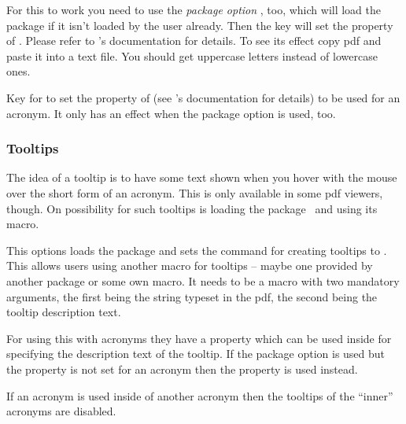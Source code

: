 \documentclass[load-preamble+]{cnltx-doc}
\begin{document}
For this to work you need to use the \emph{package option} ,
too, which will load the package  if it isn't loaded by the user
already.  Then the key  will set the 
property of .  Please refer to 's documentation
for details.  To see its effect copy \ac{pdf} and paste it into a text file.
You should get uppercase letters instead of lowercase ones.

\begin{options}
    Key for  to set the  property of
     (see 's documentation for details) to be
    used for an acronym.  It only has an effect when the package option
     is used, too.
\end{options}

\subsubsection{Tooltips}

The idea of a tooltip is to have some text shown when you hover with the
mouse over the short form of an acronym.  This is only available in some
\acs{pdf} viewers, though.  On possibility for such tooltips is loading the
 package~\cite{pkg:pdfcomment} and using its 
macro.

\begin{options}
    This options loads the  package and sets
    the command for creating tooltips to .
    This allows users using another macro for tooltips --
    maybe one provided by another package or some own macro.  It needs to be a
    macro with two mandatory arguments, the first being the string typeset in
    the \acs{pdf}, the second being the tooltip description text.
\end{options}

For using this with acronyms they have a property  which can
be used inside  for specifying the description text of the
tooltip.  If the  package option is used but the property is
not set for an acronym then the  property is used instead.

If an acronym is used inside of another acronym then the tooltips of the
``inner'' acronyms are disabled.
\end{document}
